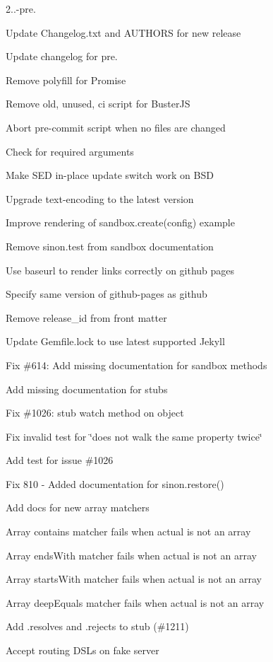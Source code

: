 \begin{DoxyItemize}
\item 2..-\/pre.
\item Update Changelog.\+txt and A\+U\+T\+H\+O\+RS for new release
\item Update changelog for pre.
\item Remove polyfill for Promise
\item Remove old, unused, ci script for Buster\+JS
\item Abort pre-\/commit script when no files are changed
\item Check for required arguments
\item Make S\+ED in-\/place update switch work on B\+SD
\item Upgrade text-\/encoding to the latest version
\item Improve rendering of sandbox.\+create(config) example
\item Remove sinon.\+test from sandbox documentation
\item Use baseurl to render links correctly on github pages
\item Specify same version of github-\/pages as github
\item Remove release\+\_\+id from front matter
\item Update Gemfile.\+lock to use latest supported Jekyll
\item Fix \#614\+: Add missing documentation for sandbox methods
\item Add missing documentation for stubs
\item Fix \#1026\+: stub watch method on object
\item Fix invalid test for \char`\"{}does not walk the same property twice\char`\"{}
\item Add test for issue \#1026
\item Fix 810 -\/ Added documentation for sinon.\+restore()
\item Add docs for new array matchers
\item Array contains matcher fails when actual is not an array
\item Array ends\+With matcher fails when actual is not an array
\item Array starts\+With matcher fails when actual is not an array
\item Array deep\+Equals matcher fails when actual is not an array
\item Add .resolves and .rejects to stub (\#1211)
\item Accept routing D\+S\+Ls on fake server

\end{DoxyItemize}
